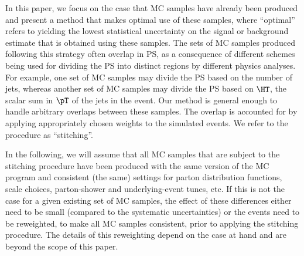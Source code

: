 In this paper, we focus on the case that MC samples have already been produced and present a method that makes optimal use of these samples,
where ``optimal'' refers to yielding the lowest statistical uncertainty on the signal or background estimate that is obtained using these samples.
The sets of MC samples produced following this strategy often overlap in PS,
as a consequence of different schemes being used for dividing the PS into distinct regions by different physics analyses.
For example, one set of MC samples may divide the PS based on the number of jets, 
whereas another set of MC samples may divide the PS based on $\HT$, the scalar sum in $\pT$ of the jets in the event.
Our method is general enough to handle arbitrary overlaps between these samples.
The overlap is accounted for by applying appropriately chosen weights to the simulated events.
We refer to the procedure as ``stitching''.

In the following, we will assume that all MC samples that are subject to the stitching procedure 
have been produced with the same version of the MC program and consistent (the same) settings 
for parton distribution functions, scale choices, parton-shower and underlying-event tunes, etc.
If this is not the case for a given existing set of MC samples,
the effect of these differences either need to be small (compared to the systematic uncertainties) or the events need to be reweighted,
to make all MC samples consistent, prior to applying the stitching procedure.
The details of this reweighting depend on the case at hand and are beyond the scope of this paper.

